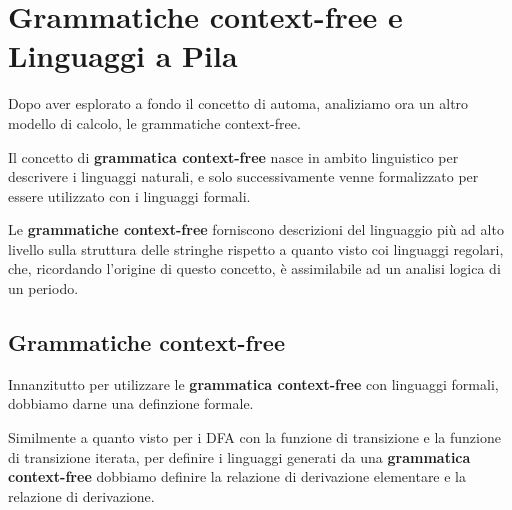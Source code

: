 \chapter{Grammatiche context-free e Linguaggi a Pila}

Dopo aver esplorato a fondo il concetto di automa, analiziamo ora un altro modello di calcolo, le grammatiche context-free.

Il concetto di \textbf{grammatica context-free} nasce in ambito linguistico per descrivere i linguaggi naturali, e solo successivamente venne formalizzato per essere utilizzato con i linguaggi formali.

Le \textbf{grammatiche context-free} forniscono descrizioni del linguaggio più ad alto livello sulla struttura delle stringhe rispetto a quanto visto coi linguaggi regolari, che, ricordando l'origine di questo concetto, è assimilabile ad un analisi logica di un periodo.

\section{Grammatiche context-free}

Innanzitutto per utilizzare le \textbf{grammatica context-free} con linguaggi formali, dobbiamo darne una definzione formale.


Similmente a quanto visto per i DFA con la funzione di transizione e la funzione di transizione iterata, per definire i linguaggi generati da una \textbf{grammatica context-free} dobbiamo definire la relazione di derivazione elementare e la relazione di derivazione.

